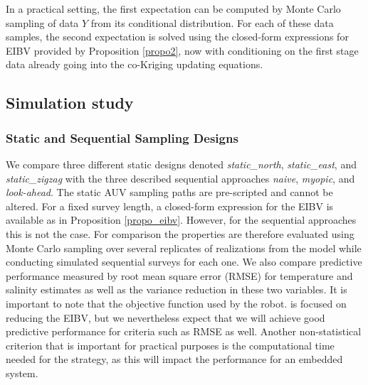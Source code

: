 \documentclass[aoas]{imsart}
\begin{document}
In a practical setting, the first expectation can be computed by Monte
Carlo sampling of data $Y$ from its conditional
distribution. For each of these data samples, the second expectation
is solved using the closed-form expressions for EIBV provided by Proposition \ref{propo2}, now with conditioning on the first stage data already going into the co-Kriging updating equations.


\subsection{Simulation study}
\label{sec:simulations}

\subsubsection{Static and Sequential Sampling Designs}
\label{sec:sampling_designs}


We compare three different static designs denoted
\textit{static\_north}, \textit{static\_east}, and
\textit{static\_zigzag} with the three described sequential approaches
\textit{naive}, \textit{myopic}, and \textit{look-ahead}. The static
AUV sampling paths are pre-scripted and cannot be altered.
For a fixed survey length, a closed-form expression for the EIBV is
available as in Proposition \ref{propo_eibv}. However, for the sequential
approaches this is not the case. For comparison the properties are
therefore evaluated using Monte Carlo sampling over several replicates
of realizations from the model while conducting simulated sequential
surveys for each one. We also compare predictive
performance measured by root mean square error (RMSE) for temperature
and salinity estimates as well as the variance reduction in these
two variables. It is important to note that the objective function
used by the robot. is focused on reducing the
EIBV, but we nevertheless expect that we will achieve good predictive
performance for criteria such as RMSE as well. Another non-statistical
criterion that is important for practical purposes is the computational
time needed for the strategy, as this will impact the performance for
an embedded system.
\end{document}
